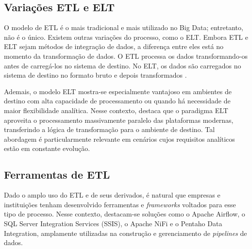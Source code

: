 \subsection{Variações ETL e ELT}

O modelo de ETL é o mais tradicional e mais utilizado no Big Data; entretanto, não é o único. 
Existem outras variações do processo, como o ELT. 
Embora ETL e ELT sejam métodos de integração de dados, a diferença entre eles está no momento da 
transformação de dados. O ETL processa os dados transformando-os antes de carregá-los no sistema de 
destino. No ELT, os dados são carregados no sistema de destino no formato bruto e depois transformados 
\cite{googlecloudetl}.

Ademais, o modelo ELT mostra-se especialmente vantajoso em ambientes de destino com alta 
capacidade de processamento ou quando há necessidade de maior flexibilidade analítica. 
Nesse contexto,  destaca que o paradigma ELT aproveita o processamento massivamente
paralelo das plataformas modernas, transferindo a lógica de transformação para o ambiente de 
destino. Tal abordagem é particularmente relevante em cenários cujos requisitos analíticos 
estão em constante evolução.

\subsection{Ferramentas de ETL}
\label{sec:ferramentas-etl}

Dado o amplo uso do ETL e de seus derivados, é natural que empresas e instituições tenham 
desenvolvido ferramentas e \textit{frameworks} voltados para esse tipo de processo. Nesse contexto, 
destacam-se soluções como o Apache Airflow, o SQL Server Integration Services (SSIS), o 
Apache NiFi e o Pentaho Data Integration, amplamente utilizadas na construção e gerenciamento 
de \textit{pipelines} de dados.

